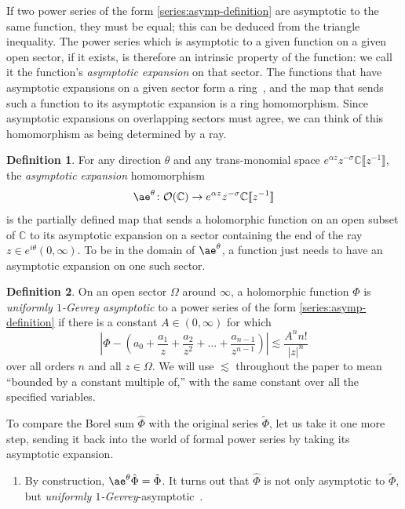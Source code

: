 \documentclass{article}
\newcommand{\maps}{\colon}
\newcommand{\C}{\mathbb{C}}
\newcommand{\series}[1]{\tilde{#1}}
\newcommand{\aexp}{\mathrm{\ae}}
\theoremstyle{definition}
\newtheorem{definition}{Definition}[section]
\theoremstyle{plain}
\begin{document}
If two power series of the form \eqref{series:asymp-definition} are asymptotic to the same function, they must be equal; this can be deduced from the triangle inequality. The power series which is asymptotic to a given function on a given open sector, if it exists, is therefore an intrinsic property of the function: we call it the function's {\em asymptotic expansion} on that sector. The functions that have asymptotic expansions on a given sector form a ring~\cite[Section~A.4]{nikolaev2023existence}, and the map that sends such a function to its asymptotic expansion is a ring homomorphism. Since asymptotic expansions on overlapping sectors must agree, we can think of this homomorphism as being determined by a ray.
\begin{definition}
For any direction $\theta$ and any trans-monomial space $e^{\alpha z} z^{-\sigma} \C \llbracket z^{-1} \rrbracket$, the {\em asymptotic expansion} homomorphism
\[ \aexp^\theta \maps \mathcal{O}(\C) \to e^{\alpha z} z^{-\sigma} \C \llbracket z^{-1} \rrbracket \]
is the partially defined map that sends a holomorphic function on an open subset of $\C$ to its asymptotic expansion on a sector containing the end of the ray $z \in e^{i\theta}(0, \infty)$. To be in the domain of $\aexp^\theta$, a function just needs to have an asymptotic expansion on one such sector.
\end{definition}
\begin{definition}\label{def:unif-gevrey-asymp}
On an open sector $\Omega$ around $\infty$, a holomorphic function $\Phi$ is {\em uniformly $1$-Gevrey asymptotic} to a power series of the form \eqref{series:asymp-definition} if there is a constant $A \in (0, \infty)$ for which
\[ \left|\Phi - \left(a_0 + \frac{a_1}{z} + \frac{a_2}{z^2} + \ldots + \frac{a_{n-1}}{z^{n-1}} \right) \right| \lesssim \frac{A^n n!}{|z|^n} \]
over all orders $n$ and all $z \in \Omega$. We will use $\lesssim$ throughout the paper to mean ``bounded by a constant multiple of,'' with the same constant over all the specified variables.
\end{definition}
To compare the Borel sum $\hat{\Phi}$ with the original series $\series{\Phi}$, let us take it one more step, sending it back into the world of formal power series by taking its asymptotic expansion.

\begin{enumerate}[start=4]
\item By construction, $\aexp^\theta \hat{\Phi} = \series{\Phi}$. It turns out that $\hat{\Phi}$ is not only asymptotic to $\series{\Phi}$, but {\em {uniformly} $1$-Gevrey}-asymptotic~\cite[Corollary~5.23]{diverg-resurg-i}.
\end{enumerate}
\end{document}
